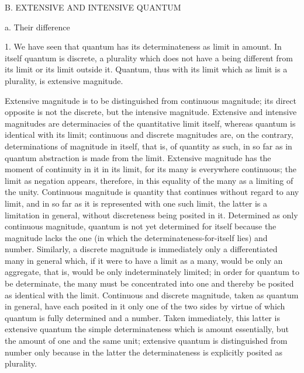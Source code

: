 B. EXTENSIVE AND INTENSIVE QUANTUM

a. Their difference

1. We have seen that quantum has
its determinateness as limit in amount.
In itself quantum is discrete, a plurality
which does not have a being different
from its limit or its limit outside it.
Quantum, thus with its limit
which as limit is a plurality,
is extensive magnitude.

Extensive magnitude is to be distinguished from continuous magnitude;
its direct opposite is not the discrete, but the intensive magnitude.
Extensive and intensive magnitudes are determinacies of
the quantitative limit itself,
whereas quantum is identical with its limit;
continuous and discrete magnitudes are, on the contrary,
determinations of magnitude in itself,
that is, of quantity as such, in so far as
in quantum abstraction is made from the limit.
Extensive magnitude has the moment of continuity in it
in its limit, for its many is everywhere continuous;
the limit as negation appears, therefore,
in this equality of the many as a limiting of the unity.
Continuous magnitude is quantity that continues
without regard to any limit,
and in so far as it is represented with one such limit,
the latter is a limitation in general,
without discreteness being posited in it.
Determined as only continuous magnitude,
quantum is not yet determined for itself
because the magnitude lacks the one
(in which the determinateness-for-itself lies)
and number.
Similarly, a discrete magnitude is
immediately only a differentiated many in general
which, if it were to have a limit as a many,
would be only an aggregate,
that is, would be only indeterminately limited;
in order for quantum to be determinate,
the many must be concentrated
into one and thereby be posited as identical with the limit.
Continuous and discrete magnitude, taken as quantum in general,
have each posited in it only one of the two sides
by virtue of which quantum is fully determined and a number.
Taken immediately, this latter is extensive quantum
the simple determinateness which is amount essentially,
but the amount of one and the same unit;
extensive quantum is distinguished from number
only because in the latter the determinateness is
explicitly posited as plurality.

